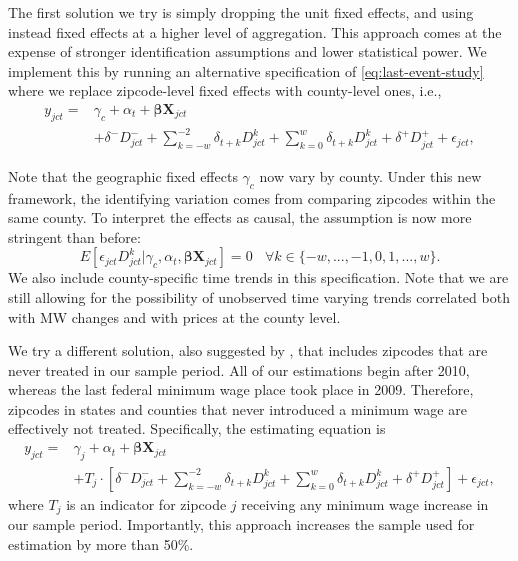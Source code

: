     The first solution we try is simply dropping the unit fixed effects, and using instead fixed effects at a higher level of aggregation. This approach comes at the expense of stronger identification assumptions and lower statistical power. We implement this by running an alternative specification of \eqref{eq:last-event-study} where we replace zipcode-level fixed effects with county-level ones, i.e.,
    \begin{equation}\label{eq:last-event-study-countyFE}
        \begin{split}
            y_{jct} = & \gamma_{c} + \alpha_{t} + \boldsymbol{\beta} \boldsymbol{X}_{jct} \\
            & + \delta^{-} D_{jct}^{-} + \sum\limits_{k = -w}^{-2}\delta_{t + k}D_{jct}^k + \sum\limits_{k = 0}^{w}\delta_{t + k} D_{jct}^k + \delta^{+} D_{jct}^{+} + \epsilon_{jct} ,
        \end{split}   
    \end{equation}
    
    Note that the geographic fixed effects $\gamma_{c}$ now vary by county. Under this new framework, the identifying variation comes from comparing zipcodes within the same county. To interpret the effects as causal, the assumption is now more stringent than before: $$E \left[ \epsilon_{jct} D_{jct}^k | \gamma_c, \alpha_{t}, \boldsymbol{\beta} \boldsymbol{X}_{jct}\right]  = 0 \  \ \ \ \forall k\in\{-w, ..., -1, 0, 1, ..., w\} .$$ We also include county-specific time trends in this specification. Note that we are still allowing for the possibility of unobserved time varying trends correlated both with MW changes and with prices at the county level.
    
    We try a different solution, also suggested by \textcite{BorusyakJaravel2017}, that includes zipcodes that are never treated in our sample period. All of our estimations begin after 2010, whereas the last federal minimum wage place took place in 2009. Therefore, zipcodes in states and counties that never introduced a minimum wage are effectively not treated. Specifically, the estimating equation is
    \begin{equation}\label{eq:last-event-study-control}
        \begin{split}
            y_{jct} = & \gamma_{j} + \alpha_{t} + \boldsymbol{\beta} \boldsymbol{X}_{jct} \\
            & + T_j\cdot\left[\delta^{-} D_{jct}^{-} + \sum\limits_{k = -w}^{-2}\delta_{t + k}D_{jct}^k + \sum\limits_{k = 0}^{w}\delta_{t + k} D_{jct}^k + \delta^{+} D_{jct}^{+}\right] + \epsilon_{jct} , 
        \end{split}   
    \end{equation}
    where $T_j$ is an indicator for zipcode $j$ receiving any minimum wage increase in our sample period. Importantly, this approach increases the sample used for estimation by more than 50\%.
    
